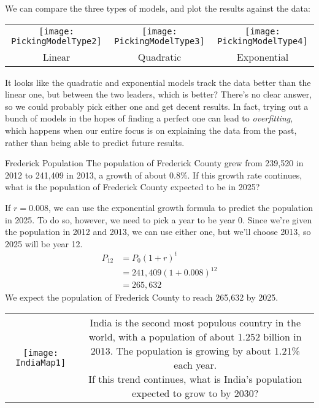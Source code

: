We can compare the three types of models, and plot the results against the data:
\begin{center}
\begin{tabular}{c c c}
\texttt{[image: PickingModelType2]}
& \texttt{[image: PickingModelType3]}
& \texttt{[image: PickingModelType4]}\\
Linear & Quadratic & Exponential
\end{tabular}
\end{center}

It looks like the quadratic and exponential models track the data better than the linear one, but between the two leaders, which is better?  There's no clear answer, so we could probably pick either one and get decent results.  In fact, trying out a bunch of models in the hopes of finding a perfect one can lead to \emph{overfitting}, which happens when our entire focus is on explaining the data from the past, rather than being able to predict future results.
\pagebreak

\begin{example}[https://www.youtube.com/watch?v=NHLi7ekPSPM&list=PLfmpjsIzhztutjEb8Pg5OBOlI1p80yVoy&index=8]{Frederick Population}
The population of Frederick County grew from 239,520 in 2012 to 241,409 in 2013, a growth of about 0.8\%.  If this growth rate continues, what is the population of Frederick County expected to be in 2025?

\solline
{}
If $r=0.008$, we can use the exponential growth formula to predict the population in 2025.  To do so, however, we need to pick a year to be year 0.  Since we're given the population in 2012 and 2013, we can use either one, but we'll choose 2013, so 2025 will be year 12.
\begin{align*}
P_{12} &= P_0 (1+r)^t\\
&= 241,409(1+0.008)^{12}\\
&= \boxed{265,632}
\end{align*}
We expect the population of Frederick County to reach 265,632 by 2025.
\end{example}

\begin{try}
\begin{tabular}{c c}
\texttt{[image: IndiaMap1]} & 
\parbox[b]{2.5in}{India is the second most populous country in the world, with a population of about 1.252 billion in 2013.  The population is growing by about 1.21\% each year.\\

If this trend continues, what is India's population expected to grow to by 2030?}
\end{tabular}
\end{try}


